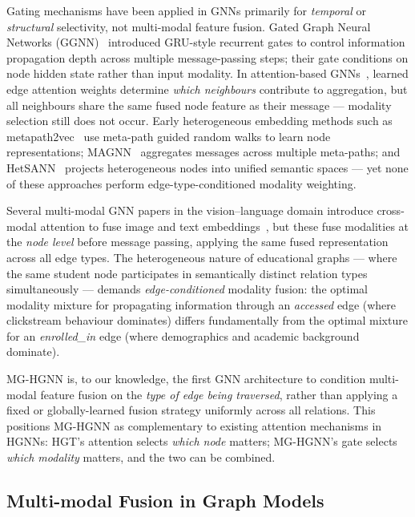 \documentclass[sigconf]{acmart}
\begin{document}
Gating mechanisms have been applied in GNNs primarily for
\emph{temporal} or \emph{structural} selectivity, not
multi-modal feature fusion. Gated Graph Neural Networks
(GGNN)~\citep{li2015gated} introduced GRU-style recurrent
gates to control information propagation depth across
multiple message-passing steps; their gate conditions on
node hidden state rather than input modality. In
attention-based GNNs~\citep{velivckovic2018graph,
hu2020heterogeneous}, learned edge attention weights
determine \emph{which neighbours} contribute to aggregation,
but all neighbours share the same fused node feature as
their message --- modality selection still does not occur.
Early heterogeneous embedding methods such as
metapath2vec~\citep{dong2017metapath2vec} use
meta-path guided random walks to learn node
representations; MAGNN~\citep{fu2020magnn} aggregates
messages across multiple meta-paths; and
HetSANN~\citep{hong2019hetsann} projects heterogeneous
nodes into unified semantic spaces --- yet none of these
approaches perform edge-type-conditioned modality
weighting.

Several multi-modal GNN papers in the vision--language domain
introduce cross-modal attention to fuse image and text
embeddings~\citep{yang2024hypergraph}, but these fuse
modalities at the \emph{node level} before message passing,
applying the same fused representation across all edge types.
The heterogeneous nature of educational graphs --- where the
same student node participates in semantically distinct
relation types simultaneously --- demands
\emph{edge-conditioned} modality fusion: the optimal modality
mixture for propagating information through an
\textit{accessed} edge (where clickstream behaviour dominates)
differs fundamentally from the optimal mixture for an
\textit{enrolled\_in} edge (where demographics and academic
background dominate).

MG-HGNN is, to our knowledge, the first GNN architecture to
condition multi-modal feature fusion on the \emph{type of
edge being traversed}, rather than applying a fixed or
globally-learned fusion strategy uniformly across all
relations. This positions MG-HGNN as complementary to
existing attention mechanisms in HGNNs: HGT's attention
selects \emph{which node} matters; MG-HGNN's gate selects
\emph{which modality} matters, and the two can be combined.

\subsection{Multi-modal Fusion in Graph Models}
\end{document}
